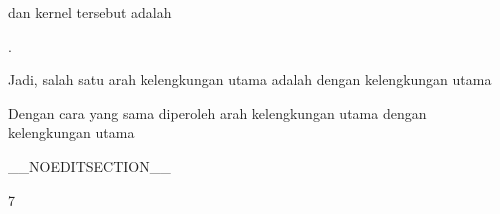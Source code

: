 {dan kernel tersebut adalah

 { . }

Jadi, salah satu arah kelengkungan utama adalah
 dengan kelengkungan utama

Dengan cara yang sama diperoleh arah kelengkungan utama
 dengan kelengkungan utama

 }

__NOEDITSECTION__

{7}

